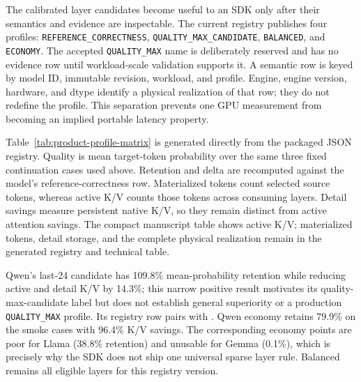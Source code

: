 \documentclass[11pt]{article}
\newcommand{\QualityMaxCandidate}{\texttt{QUALITY\_\allowbreak MAX\_\allowbreak CANDIDATE}}
\newcommand{\QualityMax}{\texttt{QUALITY\_\allowbreak MAX}}
\newcommand{\ReferenceCorrectness}{\texttt{REFERENCE\_\allowbreak CORRECTNESS}}
\begin{document}
\begin{table}[H]
\centering
\scriptsize
\caption{Compact product matrix. Sparse quality-max settings remain candidates
until held-out workload calibration closes their evidence tier.}
\resizebox{\linewidth}{!}{}
\label{tab:product-matrix-v2}
\end{table}

The calibrated layer candidates become useful to an SDK only after their
semantics and evidence are inspectable. The current registry publishes four
profiles: \ReferenceCorrectness,
\QualityMaxCandidate, \texttt{BALANCED}, and \texttt{ECONOMY}.
The accepted \QualityMax{} name is deliberately reserved and has no
evidence row until workload-scale validation supports it. A semantic row is
keyed by model ID, immutable revision, workload, and profile. Engine, engine
version, hardware, and dtype identify a physical realization of that row; they
do not redefine the profile. This separation prevents one GPU measurement
from becoming an implied portable latency property.

Table~\ref{tab:product-profile-matrix} is generated directly from the packaged
JSON registry. Quality is mean target-token probability over the same three
fixed continuation cases used above. Retention and delta are recomputed against
the model's reference-correctness row. Materialized tokens count selected source
tokens, whereas active K/V counts those tokens across consuming layers. Detail
savings measure persistent native K/V, so they remain distinct from active
attention savings. The compact manuscript table shows active K/V; materialized
tokens, detail storage, and the complete physical realization remain in the
generated registry and technical table.

\begin{table}[H]
\centering
\caption{Model-specific product profiles. This is \textsc{Smoke} evidence over
three fixed cases, not workload-scale quality. Quality-max candidates are
explicitly \textsc{Calibration Pending}; Gemma rows also remain
partial-topology at the mechanism level.}
\label{tab:product-profile-matrix}
\scriptsize
\setlength{\tabcolsep}{4pt}

\normalsize
\end{table}

Qwen's last-24 candidate has 109.8\% mean-probability retention while reducing
active and detail K/V by 14.3\%; this narrow positive result motivates its
quality-max-candidate label but does not establish general superiority or a
production \QualityMax{} profile. Its registry row pairs
 with
. Qwen economy retains 79.9\% on
the smoke cases with 96.4\% K/V savings. The corresponding
economy points are poor for Llama (38.8\% retention) and unusable for Gemma
(0.1\%), which is precisely why the SDK does not ship one universal sparse
layer rule. Balanced remains all eligible layers for this registry version.
\end{document}
